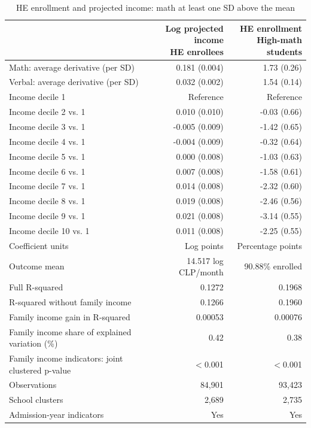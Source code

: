 \begin{table}[!htbp]\centering
\caption{HE enrollment and projected income: math at least one SD above the mean}
\label{tab:high-math-income-enrollment-cubic-income}
\small
\begin{tabular}{lrr}\hline\hline
 & \shortstack{Log projected income\\HE enrollees} & \shortstack{HE enrollment\\High-math students} \\ \hline
Math: average derivative (per SD) & 0.181 (0.004) & 1.73 (0.26) \\
Verbal: average derivative (per SD) & 0.032 (0.002) & 1.54 (0.14) \\
Income decile 1 & Reference & Reference \\
Income decile 2 vs. 1 & 0.010 (0.010) & -0.03 (0.66) \\
Income decile 3 vs. 1 & -0.005 (0.009) & -1.42 (0.65) \\
Income decile 4 vs. 1 & -0.004 (0.009) & -0.32 (0.64) \\
Income decile 5 vs. 1 & 0.000 (0.008) & -1.03 (0.63) \\
Income decile 6 vs. 1 & 0.007 (0.008) & -1.58 (0.61) \\
Income decile 7 vs. 1 & 0.014 (0.008) & -2.32 (0.60) \\
Income decile 8 vs. 1 & 0.019 (0.008) & -2.46 (0.56) \\
Income decile 9 vs. 1 & 0.021 (0.008) & -3.14 (0.55) \\
Income decile 10 vs. 1 & 0.011 (0.008) & -2.25 (0.55) \\
\hline
Coefficient units & Log points & Percentage points \\
Outcome mean & 14.517 log CLP/month & 90.88\% enrolled \\
Full R-squared & 0.1272 & 0.1968 \\
R-squared without family income & 0.1266 & 0.1960 \\
Family income gain in R-squared & 0.00053 & 0.00076 \\
Family income share of explained variation (\%) & 0.42 & 0.38 \\
Family income indicators: joint clustered p-value & $<$0.001 & $<$0.001 \\
Observations & 84,901 & 93,423 \\
School clusters & 2,689 & 2,735 \\
Admission-year indicators & Yes & Yes \\
\hline\hline\end{tabular}

\end{table}
